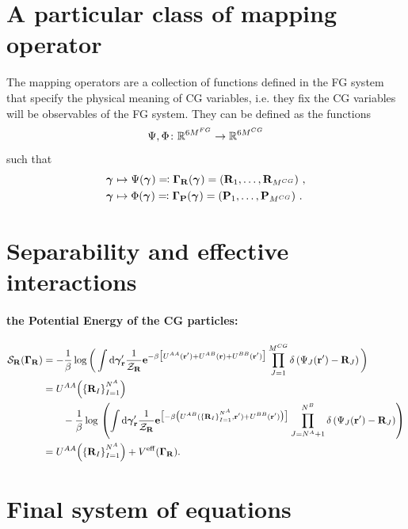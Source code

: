 \documentclass[10pt,a4paper]{book}
\theoremstyle{definition}
\begin{document}
\section{A particular class of mapping operator}
\label{Sec:Mapping}
The mapping operators are a collection of functions defined in the FG system that specify the physical meaning of CG variables, i.e. they fix the CG variables will be observables of the FG system. They can be defined as the functions
$$\Psi,\Phi\colon  \mathbb{R}^{6M^{FG}}  \to  \mathbb{R}^{6M^{CG}}$$ such that 
\begin{align*}
\boldsymbol\gamma_{}  &\mapsto \Psi(\boldsymbol\gamma_{}) \eqqcolon \boldsymbol\Gamma_{\mathbf{R}}(\boldsymbol\gamma_{})=\left(\mathbf{R}_1,\ldots,\mathbf{R}_{M^{CG}}\right)\,,\\
\boldsymbol\gamma_{}  &\mapsto \Phi(\boldsymbol\gamma_{}) \eqqcolon \boldsymbol\Gamma_{\mathbf{P}}(\boldsymbol\gamma_{})=\left(\mathbf{P}_1,\ldots,\mathbf{P}_{M^{CG}}\right)\,.
\end{align*}

\section{Separability and effective interactions}
\paragraph{the Potential Energy of the CG particles:}
\begin{align}\label{Eq:EntrInt}
  \mathcal{S}_{\mathbf{R}}(\boldsymbol\Gamma_{\mathbf{R}})
  &=-\frac{1}{\beta} \log{} \bigg(\int\mbox{d}\boldsymbol\gamma_{\mathbf{r}}' \frac{1}{\mathcal{\mathcal{Z}_{\mathbf{R}}}}
    \mathbf{e}^{-\beta \big[U^{AA}(\mathbf{r}')+U^{AB}(\mathbf{r})+U^{BB}(\mathbf{r}')\big]}\prod_{J=1}^{M^{CG}}
    \delta\left({\Psi_{J}(\mathbf{r}')-\mathbf{R}_{J}}\right) \bigg) \nonumber 	\\
  & = U^{AA}\Big(\{\mathbf{R}_I\}_{I=1}^{N_{}^A}\Big)  \nonumber\\
  &\qquad - \frac{1}{\beta} \log{}  \left(\int{\mbox{d}\boldsymbol\gamma_{\mathbf{r}}' \frac{1}{\mathcal{\mathcal{Z}_{\mathbf{R}}}}
    \mathbf{e}^{\big[{{-\beta \big(U^{AB}(\{\mathbf{R}_I\}_{I=1}^{N_{}^A},\mathbf{r}') +U^{BB}(\mathbf{r}') \big)}\big]}}}
    \prod_{J=N_{}^A+1}^{N_{}^B}\delta\left({\Psi_{J}(\mathbf{r}')-\mathbf{R}_{J}}\right)\right)  \nonumber 	\\
  & = U^{AA}\Big(\{\mathbf{R}_I\}_{I=1}^{N_{}^A}\Big) + V^{\mathrm{eff}}(\boldsymbol\Gamma_{\mathbf{R}}).
\end{align}



\section{Final system of equations}
\end{document}
